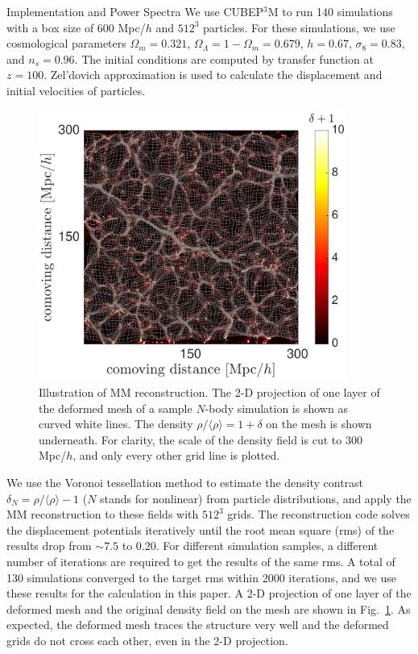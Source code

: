 \begin{section}{Implementation and Power Spectra}
  \label{sec:simulation}
  We use \textsc{CUBEP$^3$M} \cite{bib:Harnois2013} to run
  140 simulations with a box size of 600 Mpc/$h$ and $512^3$ particles.
  For these simulations, we use cosmological
  parameters $\Omega_m=0.321$, $\Omega_{\Lambda}=1-\Omega_m=0.679$,
  $h=0.67$, $\sigma_8=0.83$, and $n_s=0.96$.
  The initial conditions are computed by
  transfer function \cite{bib:Lewis2000}
  at $z=100$.
  Zel'dovich
  approximation is used to calculate the displacement and initial velocities
  of particles.

  \begin{figure}[t!]
    \centering
    \includegraphics[width=0.9\textwidth]{fig1.pdf}
    \caption{ Illustration of MM reconstruction.
      The 2-D projection of one layer of the deformed mesh of a sample
      $N$-body simulation is shown as curved white lines.  The
      density $\rho/\langle\rho\rangle=1+\delta$ on the mesh is shown
      underneath. For clarity, the scale of the density field is cut to 
      300 Mpc/$h$, and only every other grid line is plotted.}
    \label{fig:simandrec}
 \end{figure}

 We use the Voronoi tessellation method \cite{bib:Van1994} to estimate the density contrast
 $\delta_N=\rho/\langle\rho\rangle-1$ ($N$ stands for nonlinear) from particle distributions, and apply the
 MM reconstruction to these fields with $512^3$ grids.
 The reconstruction code solves the displacement potentials iteratively
 until the root mean square (rms) of the results drop from $\sim 7.5$
 to 0.20. For different simulation samples, a different number of
 iterations are required to get the results of the same rms. A total of
 130 simulations converged to the target rms within 2000 iterations, 
 and we use these results for the calculation in this paper.
 A 2-D projection
 of one layer of the deformed mesh and the original density field on
 the mesh are shown in Fig.~\ref{fig:simandrec}. 
 As expected, the deformed mesh traces the structure very well and
 the deformed grids do not cross each other, even in the 2-D projection.
 

\end{section}
